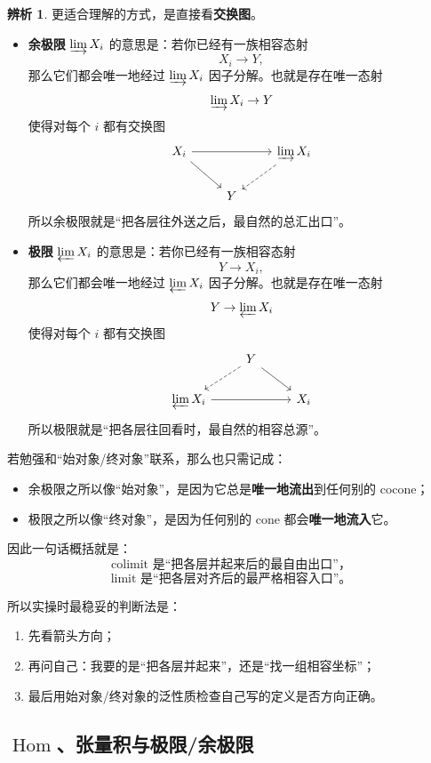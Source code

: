 \documentclass[a4paper]{ctexart}
\theoremstyle{definition}
\theoremstyle{analysis}
\newtheorem{remark}{辨析}[section]
\theoremstyle{plain}
\begin{document}
\begin{remark}
更适合理解的方式，是直接看\textbf{交换图}。

\begin{itemize}
  \item \textbf{余极限} \(\varinjlim X_i\) 的意思是：若你已经有一族相容态射
  \[
    X_i\to Y,
  \]
  那么它们都会唯一地经过 \(\varinjlim X_i\) 因子分解。也就是存在唯一态射
  \[
    \varinjlim X_i \to Y
  \]
  使得对每个 \(i\) 都有交换图
  \[
  \begin{tikzcd}
    X_i \arrow[rr] \arrow[dr] & & \varinjlim X_i \arrow[dl, dashed] \\
    & Y &
  \end{tikzcd}
  \]
  所以余极限就是“把各层往外送之后，最自然的总汇出口”。

  \item \textbf{极限} \(\varprojlim X_i\) 的意思是：若你已经有一族相容态射
  \[
    Y\to X_i,
  \]
  那么它们都会唯一地经过 \(\varprojlim X_i\) 因子分解。也就是存在唯一态射
  \[
    Y \to \varprojlim X_i
  \]
  使得对每个 \(i\) 都有交换图
  \[
  \begin{tikzcd}
    & Y \arrow[dl, dashed] \arrow[dr] & \\
    \varprojlim X_i \arrow[rr] & & X_i
  \end{tikzcd}
  \]
  所以极限就是“把各层往回看时，最自然的相容总源”。
\end{itemize}

若勉强和“始对象/终对象”联系，那么也只需记成：
\begin{itemize}
  \item 余极限之所以像“始对象”，是因为它总是\textbf{唯一地流出}到任何别的 cocone；
  \item 极限之所以像“终对象”，是因为任何别的 cone 都会\textbf{唯一地流入}它。
\end{itemize}

因此一句话概括就是：
\[
  \text{colimit 是“把各层并起来后的最自由出口”，}
\]
\[
  \text{limit 是“把各层对齐后的最严格相容入口”。}
\]

所以实操时最稳妥的判断法是：
\begin{enumerate}
  \item 先看箭头方向；
  \item 再问自己：我要的是“把各层并起来”，还是“找一组相容坐标”；
  \item 最后用始对象/终对象的泛性质检查自己写的定义是否方向正确。
\end{enumerate}
\end{remark}

\subsection{\texorpdfstring{\(\operatorname{Hom}\)、张量积与极限/余极限}{Hom、张量积与极限/余极限}}\label{subsec:hom-tensor-limits}
\end{document}
